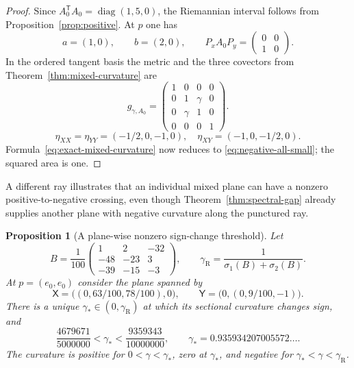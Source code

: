 \documentclass[11pt]{amsart}
\newtheorem{proposition}[theorem]{Proposition}
\theoremstyle{definition}
\theoremstyle{remark}
\begin{document}
\begin{proof}
Since $A_0^{\mathsf T}A_0=\operatorname{diag}(1,5,0)$, the Riemannian
interval follows
from Proposition~\ref{prop:positive}.  At $p$ one has
\[
 a=(1,0),\qquad b=(2,0),\qquad
 P_xA_0P_y=\begin{pmatrix}0&0\\1&0\end{pmatrix}.
\]
In the ordered tangent basis the metric and the three covectors from
Theorem~\ref{thm:mixed-curvature} are
\[
 g_{\gamma,A_0}=
 \begin{pmatrix}
  1&0&0&0\\0&1&\gamma&0\\0&\gamma&1&0\\0&0&0&1
 \end{pmatrix}.
\]
\[
 \eta_{XX}=\eta_{YY}=(-1/2,0,-1,0),
 \quad
 \eta_{XY}=(-1,0,-1/2,0).
\]
Formula~\eqref{eq:exact-mixed-curvature} now reduces to
\eqref{eq:negative-all-small}; the squared area is one.
\end{proof}

A different ray illustrates that an individual mixed plane can have a
nonzero positive-to-negative crossing, even though
Theorem~\ref{thm:spectral-gap} already supplies another plane with
negative curvature along the punctured ray.

\begin{proposition}[A plane-wise nonzero sign-change threshold]
\label{prop:positive-threshold}
Let
\[
 B=\frac1{100}
 \begin{pmatrix}1&2&-32\\-48&-23&3\\-39&-15&-3\end{pmatrix},
 \qquad
 \gamma_{\mathrm R}=\frac1{\sigma_1(B)+\sigma_2(B)}.
\]
At $p=(e_0,e_0)$ consider the plane spanned by
\[
 \mathsf X=\big((0,63/100,78/100),0\big),\qquad
 \mathsf Y=\big(0,(0,9/100,-1)\big).
\]
There is a unique $\gamma_*\in(0,\gamma_{\mathrm R})$ at which its
sectional curvature changes sign, and
\begin{equation}\label{eq:threshold-bracket}
 \frac{4679671}{5000000}<\gamma_*
 <\frac{9359343}{10000000},
 \qquad
 \gamma_*=0.935934207005572\ldots.
\end{equation}
The curvature is positive for $0<\gamma<\gamma_*$, zero at
$\gamma_*$, and negative for $\gamma_*<\gamma<\gamma_{\mathrm R}$.
\end{proposition}
\end{document}
